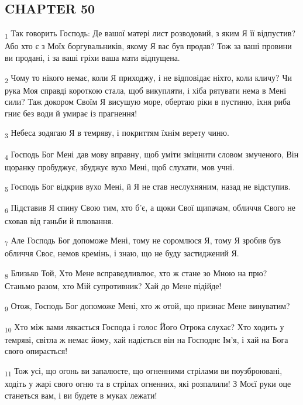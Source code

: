\subsection{CHAPTER 50}
\begin{tcolorbox}
\textsubscript{1} Так говорить Господь: Де вашої матері лист розводовий, з яким Я її відпустив? Або хто є з Моїх боргувальників, якому Я вас був продав? Тож за ваші провини ви продані, і за ваші гріхи ваша мати відпущена.
\end{tcolorbox}
\begin{tcolorbox}
\textsubscript{2} Чому то нікого немає, коли Я приходжу, і не відповідає ніхто, коли кличу? Чи рука Моя справді короткою стала, щоб викупляти, і хіба рятувати нема в Мені сили? Таж докором Своїм Я висушую море, обертаю ріки в пустиню, їхня риба гниє без води й умирає із прагнення!
\end{tcolorbox}
\begin{tcolorbox}
\textsubscript{3} Небеса зодягаю Я в темряву, і покриттям їхнім верету чиню.
\end{tcolorbox}
\begin{tcolorbox}
\textsubscript{4} Господь Бог Мені дав мову вправну, щоб уміти зміцнити словом змученого, Він щоранку пробуджує, збуджує вухо Мені, щоб слухати, мов учні.
\end{tcolorbox}
\begin{tcolorbox}
\textsubscript{5} Господь Бог відкрив вухо Мені, й Я не став неслухняним, назад не відступив.
\end{tcolorbox}
\begin{tcolorbox}
\textsubscript{6} Підставив Я спину Свою тим, хто б'є, а щоки Свої щипачам, обличчя Свого не сховав від ганьби й плювання.
\end{tcolorbox}
\begin{tcolorbox}
\textsubscript{7} Але Господь Бог допоможе Мені, тому не соромлюся Я, тому Я зробив був обличчя Своє, немов кремінь, і знаю, що не буду застиджений Я.
\end{tcolorbox}
\begin{tcolorbox}
\textsubscript{8} Близько Той, Хто Мене всправедливлює, хто ж стане зо Мною на прю? Станьмо разом, хто Мій супротивник? Хай до Мене підійде!
\end{tcolorbox}
\begin{tcolorbox}
\textsubscript{9} Отож, Господь Бог допоможе Мені, хто ж отой, що признає Мене винуватим?
\end{tcolorbox}
\begin{tcolorbox}
\textsubscript{10} Хто між вами лякається Господа і голос Його Отрока слухає? Хто ходить у темряві, світла ж немає йому, хай надіється він на Господнє Ім'я, і хай на Бога свого опирається!
\end{tcolorbox}
\begin{tcolorbox}
\textsubscript{11} Тож усі, що огонь ви запалюєте, що огненними стрілами ви поузброювані, ходіть у жарі свого огню та в стрілах огненних, які розпалили! З Моєї руки оце станеться вам, і ви будете в муках лежати!
\end{tcolorbox}
